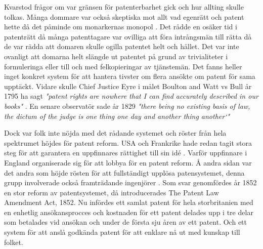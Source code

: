 %
%
%
%


Kvarstod frågor om var gränsen för patenterbarhet gick och hur allting skulle tolkas\cite{bracha}. Många dommare var också skeptiska mot allt vad egenrätt och patent hette då det påminde om monarkernas monopol \cite{macleod}.
Det rådde en osäker tid i patenträtt då många patenttagare var ovilliga att föra intrångsmän till
rätta då de var rädda att domaren skulle ogilla patentet helt och hållet. Det var inte ovanligt att
domarna helt slängde ut patentet på grund av trivialiteter i formuleringa eller till och med
felkopieringar av tjänstemän\cite{macleod}. Det fanns heller inget konkret system för att hantera tivster om flera ansökte om patent för sama upptäckt\cite{bracha, webster}. Vidare skulle Chief Justice Eyre i målet Boulton and Watt vs Bull år 1795 ha sagt \emph{"patent rights are nowhere that I can find accurately described in our books"} \cite{macleod}. En senare observatör sade år 1829 \emph{"there being no existing basis of law, the dictum of the judge is 
one thing one day and another thing another‘"} \cite{macleod}



Dock var folk inte nöjda med det rådande systemet och röster från hela spektrumet höjdes för patent reform. USA och Frankrike hade redan tagit stora steg för att garantera en uppfinnares rättighet till sin idé \cite{macleod}. Varför uppfinnare i England organiserade sig för att lobbya för en patent reform\cite{dutton}. Å andra sidan var det andra som höjde rösten för att fullständigt upplösa patensystemet, denna grupp involverade också framträdande ingenjörer \cite{macleod}.  
Som svar genomfördes år 1852 en stor reform av patentsystemet, då introducerades The Patent Law Amendment Act, 1852. Nu infördes ett samlat patent för hela storbritanien med en enhetlig ansökansprocces och kostnaden för ett patent delades upp i tre delar som betalades vid ansökan och under de första sju åren av ett patent. Och ett system för att anslå godkända patent för att enklare nå ut med kunskap till folket\cite{dutton}.

